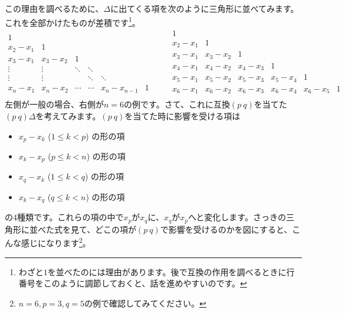 この理由を調べるために、$\Delta$に出てくる項を次のように三角形に並べてみます。これを全部かけたものが差積です\footnote{わざと$1$を並べたのには理由があります。後で互換の作用を調べるときに行番号をこのように調節しておくと、話を進めやすいのです。}。
\[
\begin{array}{cccccc}
1 & \\
x_2 - x_1 & 1 \\
x_3 - x_1 & x_3 - x_2 & 1 \\
\vdots & \vdots & \ddots & \ddots \\
\vdots & \vdots & & \ddots & \ddots \\
x_n - x_1 & x_n - x_2 & \cdots & \cdots &  x_n - x_{n - 1} & 1
\end{array} \qquad
\begin{array}{cccccc} %
1 & \\
x_2 - x_1 & 1 \\
x_3 - x_1 & x_3 - x_2 & 1 \\
x_4 - x_1 & x_4 - x_2 & x_4 - x_3 & 1 \\
x_5 - x_1 & x_5 - x_2 & x_5 - x_3 & x_5 - x_4 & 1 \\
x_6 - x_1 & x_6 - x_2 & x_6 - x_3 & x_6 - x_4 & x_6 - x_5 & 1 \\
\end{array}
\]
左側が一般の場合、右側が$n = 6$の例です。さて、これに互換$(p\ q)$を当てた$(p\ q)\Delta$を考えてみます。$(p\ q)$を当てた時に影響を受ける項は\begin{itemize}
\item $x_p - x_k$ ($1 \leq k < p$) の形の項
\item $x_k - x_p$ ($p \leq k < n$) の形の項
\item $x_q - x_k$ ($1 \leq k < q$) の形の項
\item $x_k - x_q$ ($q \leq k < n$) の形の項
\end{itemize}
の$4$種類です。これらの項の中で$x_p$が$x_q$に、$x_q$が$x_p$へと変化します。さっきの三角形に並べた式を見て、どこの項が$(p\ q)$で影響を受けるのかを図にすると、こんな感じになります\footnote{$n = 6, p = 3, q = 5$の例で確認してみてください。}。
